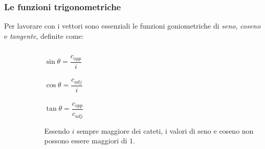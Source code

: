 \documentclass[]{beamer}
\theoremstyle{plain}
\begin{document}
\begin{frame}
  \frametitle{Le funzioni trigonometriche}
Per lavorare con i vettori sono essenziali le funzioni goniometriche di \emph{seno}, \emph{coseno} e \emph{tangente}, definite come:



\begin{columns}
\begin{column}{0.5\textwidth}

  \begin{figure}
  \end{figure}

\end{column}
\begin{column}{0.5\textwidth}

\begin{center}
\colorbox{blue!30}{$ \sin\theta = \dfrac{c_{opp}}{i} $}\\~\\
\colorbox{blue!30}{$ \cos\theta = \dfrac{c_{adj}}{i} $}\\~\\
\colorbox{blue!30}{$ \tan\theta = \dfrac{c_{opp}}{c_{adj}} $}
\end{center}
Essendo $ i $ sempre maggiore dei cateti, i valori di seno e coseno non possono essere maggiori di $ 1 $.
\end{column}
\end{columns}
\end{frame}
\end{document}
